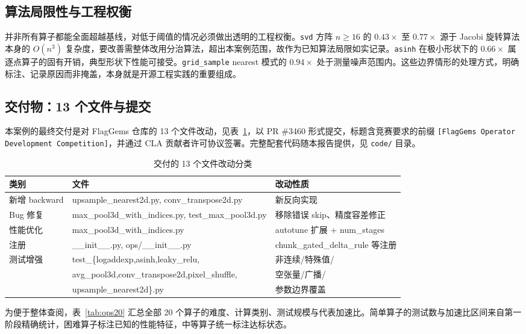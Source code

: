 \subsection{算法局限性与工程权衡}
并非所有算子都能全面超越基线，对低于阈值的情况必须做出透明的工程权衡。\texttt{svd} 方阵 $n\geqslant16$ 的 $0.43\times$ 至 $0.77\times$ 源于 Jacobi 旋转算法本身的 $O(n^3)$ 复杂度，要改善需整体改用分治算法，超出本案例范围，故作为已知算法局限如实记录。\texttt{asinh} 在极小形状下的 $0.66\times$ 属逐点算子的固有开销，典型形状下性能可接受。\texttt{grid\_sample} nearest 模式的 $0.94\times$ 处于测量噪声范围内。这些边界情形的处理方式，明确标注、记录原因而非掩盖，本身就是开源工程实践的重要组成。

\subsection{交付物：13 个文件与提交}
本案例的最终交付是对 FlagGems 仓库的 13 个文件改动，见表~\ref{tab:files}，以 PR \#3460 形式提交，标题含竞赛要求的前缀 \texttt{[FlagGems Operator Development Competition]}，并通过 CLA 贡献者许可协议签署。完整配套代码随本报告提供，见 \texttt{code/} 目录。

\begin{table}[!htbp]
\centering\small
\caption{交付的 13 个文件改动分类}
\label{tab:files}
\renewcommand{\arraystretch}{1.1}
\begin{tabularx}{\textwidth}{lXX}
\toprule
类别 & 文件 & 改动性质 \\
\midrule
新增 backward & upsample\_nearest2d.py, conv\_transpose2d.py & 新反向实现 \\
Bug 修复 & max\_pool3d\_with\_indices.py, test\_max\_pool3d.py & 移除错误 skip、精度容差修正 \\
性能优化 & max\_pool3d\_with\_indices.py & autotune 扩展 + num\_stages \\
注册 & \_\_init\_\_.py, ops/\_\_init\_\_.py & chunk\_gated\_delta\_rule 等注册 \\
测试增强 & test\_\{logaddexp,asinh,leaky\_relu, & 非连续/特殊值/ \\
 & avg\_pool3d,conv\_transpose2d,pixel\_shuffle, & 空张量/广播/ \\
 & upsample\_nearest2d\}.py & 参数边界覆盖 \\
\bottomrule
\end{tabularx}
\end{table}

为便于整体查阅，表~\ref{tab:ops20} 汇总全部 20 个算子的难度、计算类别、测试规模与代表加速比。简单算子的测试数与加速比区间来自第一阶段精确统计，困难算子标注已知的性能特征，中等算子统一标注达标状态。

